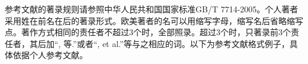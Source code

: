 	参考文献的著录规则请参照中华人民共和国国家标准GB/T 7714-2005。个人著者采用姓在前名在后的著录形式。欧美著者的名可以用缩写字母，缩写名后省略缩写点。著作方式相同的责任者不超过3个时，全部照录。超过3个时，只著录前3个责任者，其后加“, 等.”或者“, et al.”等与之相应的词。以下为参考文献格式例子，具体依据个人参考文献。

	\begingroup
	    \setlength{\bibsep}{0pt}
	\endgroup

\cleardoublepage
\section*{} %
\label{sec:附件}
